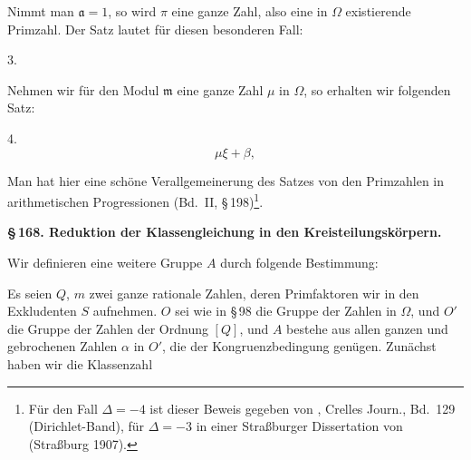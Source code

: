 
Nimmt man $\mathfrak{a} = 1$, so wird $\pi$ eine ganze Zahl, also eine in $\Omega$ existierende Primzahl. Der Satz lautet für diesen besonderen Fall:

3. 

Nehmen wir für den Modul $\mathfrak{m}$ eine ganze Zahl $\mu$ in $\Omega$, so erhalten wir folgenden Satz:

4. 
\[
\mu\xi + \beta,
\]

Man hat hier eine schöne Verallgemeinerung des Satzes von den Primzahlen in arithmetischen Progressionen (Bd.\ II, \S\,198)\footnote{Für den Fall $\Delta = -4$ ist dieser Beweis gegeben von , Crelles Journ., Bd.\ 129 (Dirichlet-Band), für $\Delta = -3$ in einer Straßburger Dissertation von  (Straßburg 1907).}.

\begin{center}
\textbf{\S\,168. Reduktion der Klassengleichung in den Kreisteilungskörpern.}
\end{center}

Wir definieren eine weitere Gruppe $A$ durch folgende Bestimmung:

Es seien $Q$, $m$ zwei ganze rationale Zahlen, deren Primfaktoren wir in den Exkludenten $S$ aufnehmen. $O$ sei wie in \S\,98 die Gruppe der Zahlen in $\Omega$, und $O'$ die Gruppe der Zahlen der Ordnung $[Q]$, und $A$ bestehe aus allen ganzen und gebrochenen Zahlen $\alpha$ in $O'$, die der Kongruenzbedingung
genügen. Zunächst haben wir die Klassenzahl
